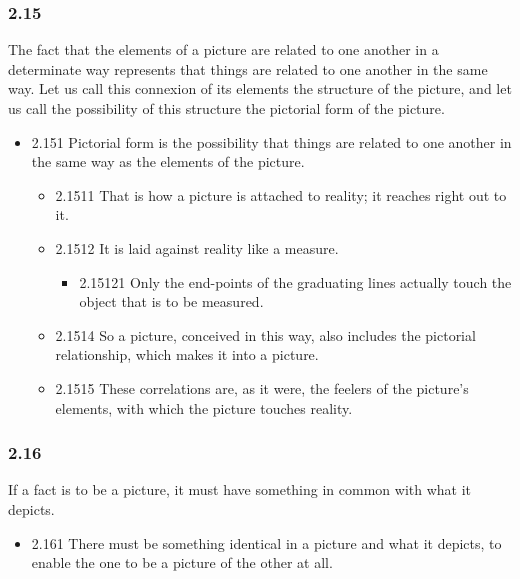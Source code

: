 \documentclass[11pt]{article}
\begin{document}
\subsubsection*{2.15}
\label{sec:org2f085c0}
The fact that the elements of a picture are related to one another in
a determinate way represents that things are related to one another in the
same way. Let us call this connexion of its elements the structure of the
picture, and let us call the possibility of this structure the pictorial
form of the picture.
\begin{itemize}
\item 2.151
\label{sec:org308057b}
Pictorial form is the possibility that things are related to one
another in the same way as the elements of the picture.
\begin{itemize}
\item 2.1511
\label{sec:orgee4d88b}
That is how a picture is attached to reality; it reaches right out
to it.
\item 2.1512
\label{sec:org0defcf2}
It is laid against reality like a measure.
\begin{itemize}
\item 2.15121
\label{sec:org49d8d0c}
Only the end-points of the graduating lines actually touch the
object that is to be measured.
\end{itemize}
\item 2.1514
\label{sec:org37569c3}
So a picture, conceived in this way, also includes the pictorial
relationship, which makes it into a picture.
\item 2.1515
\label{sec:org3e7a926}
These correlations are, as it were, the feelers of the picture's
elements, with which the picture touches reality.
\end{itemize}
\end{itemize}
\subsubsection*{2.16}
\label{sec:org2b80dcf}
If a fact is to be a picture, it must have something in common with
what it depicts.
\begin{itemize}
\item 2.161
\label{sec:org95fdc92}
There must be something identical in a picture and what it depicts,
to enable the one to be a picture of the other at all.
\end{itemize}
\end{document}

